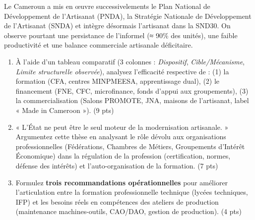 \documentclass[11pt]{article}
\begin{document}
\begin{exercice}
Le Cameroun a mis en œuvre successivelements le Plan National de Développement de l'Artisanat (PNDA), la Stratégie Nationale de Développement de l'Artisanat (SNDA) et intègre désormais l'artisanat dans la SND30. On observe pourtant une persistance de l'informel (≈ 90\% des unités), une faible productivité et une balance commerciale artisanale déficitaire.
\begin{enumerate}
    \item À l'aide d'un tableau comparatif (3 colonnes : \textit{Dispositif}, \textit{Cible/Mécanisme}, \textit{Limite structurelle observée}), analysez l'efficacité respective de : (1) la formation (CFA, centres MINPMEESA, apprentissage dual), (2) le financement (FNE, CFC, microfinance, fonds d'appui aux groupements), (3) la commercialisation (Salons PROMOTE, JNA, maisons de l'artisanat, label « Made in Cameroon »). (9 pts)
    \item « L'État ne peut être le seul moteur de la modernisation artisanale. » Argumentez cette thèse en analysant le rôle dévolu aux organisations professionnelles (Fédérations, Chambres de Métiers, Groupements d'Intérêt Économique) dans la régulation de la profession (certification, normes, défense des intérêts) et l'auto-organisation de la formation. (7 pts)
    \item Formulez \textbf{trois recommandations opérationnelles} pour améliorer l'articulation entre la formation professionnelle technique (lycées techniques, IFP) et les besoins réels en compétences des ateliers de production (maintenance machines-outils, CAO/DAO, gestion de production). (4 pts)
\end{enumerate}
\end{exercice}
\end{document}

